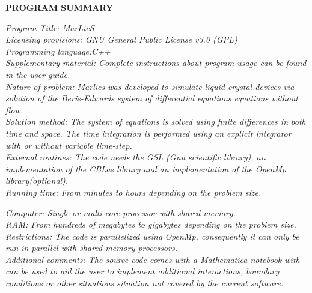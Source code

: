\documentclass[final,5p,times,twocolumn]{elsarticle}
\begin{document}
 \linenumbers


{\bf PROGRAM SUMMARY}

\begin{small}
\noindent
{\em Program Title: MarLicS}\\

{\em Licensing provisions: GNU General Public License v3.0 (GPL) }\\

{\em Programming language:C++}\\

{\em Supplementary material: Complete instructions about program usage can be found in the user-guide. }\\

{\em Nature of problem: Marlics was developed to simulate liquid crystal devices via solution of the Beris-Edwards system of differential equations equations without flow.}\\

{\em Solution method:  The system of equations is solved using finite differences in both time and space. The time integration is performed using an explicit integrator with or without variable time-step.}\\

{\em External routines: The code needs the GSL (Gnu scientific library), an implementation of the CBLas library and an implementation of the OpenMp library(optional).}\\


{\em Running time: From minutes to hours depending on the problem size.}

{\em Computer: Single or multi-core processor with shared memory.}\\

{\em RAM: From hundreds of megabytes to gigabytes depending on the problem size.}\\


{\em Restrictions: The code is parallelized using OpenMp, consequently it can only be run in parallel with shared memory  processors.}\\

{\em Additional comments: The source code comes with a Mathematica
  notebook with can be used to aid the user to implement additional
  interactions, boundary conditions or other situations situation not
  covered by the current software.}

\end{small}
\end{document}
